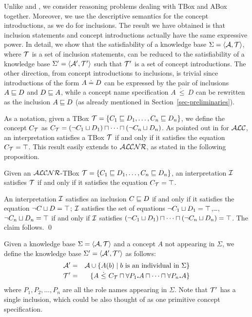 Unlike \cite{Baad90b} and \cite{Schi91}, we consider reasoning problems dealing with TBox
and ABox together. Moreover, we use the descriptive semantics for
the concept introductions, 
as we do for inclusions. The result we have obtained is that inclusion statements 
and concept introductions actually have  the same expressive power.
In detail, we show that the satisfiability of a knowledge base
$\Sigma=\langle{\cal A},{\cal T}\rangle$, where ${\cal T}$ is a set of inclusion
statements, can be reduced to the satisfiability of a knowledge base
$\Sigma'=\langle{\cal A}',{\cal T}'\rangle$ such that ${\cal T}'$ is a set of
concept introductions. The other direction, from concept
introductions to inclusions, is trivial since 
introductions of the form $A\doteq D$ can be expressed by the pair of inclusions
$A \sqsubseteq D$ and $D \sqsubseteq A$, while  a concept name specification
$A ~\dot\leq~ D$ can be rewritten as the inclusion $A \sqsubseteq D$
(as already mentioned in Section~\ref{sec-preliminaries}).

As a notation, given a TBox ${\cal T}=\{C_1 \sqsubseteq D_1,\dots,C_n \sqsubseteq D_n\}$, we define the concept $C_{\cal T}$ as 
$C_{{\cal T}}=(\neg C_1\sqcup D_1)\sqcap\cdots\sqcap(\neg C_n\sqcup D_n)$.
As pointed out in \cite{Baad90b} for ${\cal ALC}$, an interpretation satisfies a TBox
${\cal T}$ if and only if it satisfies the equation $C_{{\cal T}}=\top$. This result easily
extends to ${\cal ALCNR}$, as stated in the following proposition.

\begin{proposition}\label{c=top}
Given an ${\cal ALCNR}$-TBox  ${\cal T}=\{C_1 \sqsubseteq D_1,\dots,C_n \sqsubseteq D_n\}$,
an interpretation ${\cal I}$ satisfies ${\cal T}$ if and only if it satisfies the equation
$C_{\cal T}=\top$.
\end{proposition}
\proof
An interpretation ${\cal I}$ satisfies an inclusion $C \sqsubseteq D$ if and only if it satisfies  the equation $\neg C\sqcup D =\top$; ${\cal I}$ satisfies the set of
equations $\neg C_1\sqcup D_1=\top$,\dots, $\neg C_n\sqcup D_n=\top$
if and only if ${\cal I}$ satisfies $(\neg C_1\sqcup D_1)\sqcap\cdots\sqcap (\neg C_n\sqcup D_n)=\top$. The claim follows.
\qed

Given a knowledge base $\Sigma=\langle{\cal A},{\cal T}\rangle$ and
a concept $A$ not appearing in $\Sigma$, we define the knowledge base
$\Sigma'=\langle{\cal A}',{\cal T}'\rangle$ as follows: 
\begin{eqnarray*} 
{\cal A}'	&=&	{\cal A}\cup\{A(b) \mid \mbox{$b$ is an individual in $\Sigma$}\}\\
{\cal T}'	&=& \{A ~\dot\leq~ {C_{\cal T}\sqcap\forall P_1 \mbox{\bf .} A \sqcap\cdots \sqcap\forall P_n \mbox{\bf .} A}\}
\end{eqnarray*}
where $P_1,P_2,\dots,P_n$ are all the role names appearing in
$\Sigma$. Note that ${\cal T}'$ has a single inclusion, which could be also thought of
as one primitive concept specification.


